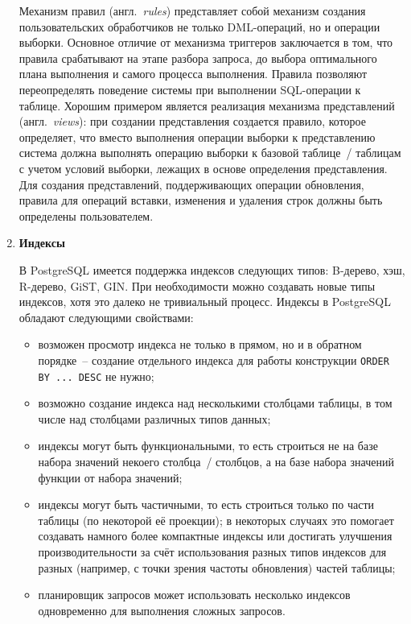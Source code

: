 \begin{enumerate}
    \tab Механизм правил (англ. \textit{rules}) представляет собой механизм создания пользовательских обработчиков не только DML-операций, но и операции выборки. Основное отличие от механизма триггеров заключается в том, что правила срабатывают на этапе разбора запроса, до выбора оптимального плана выполнения и самого процесса выполнения. Правила позволяют переопределять поведение системы при выполнении SQL-операции к таблице. Хорошим примером является реализация механизма представлений (англ. \textit{views}): при создании представления создается правило, которое определяет, что вместо выполнения операции выборки к представлению система должна выполнять операцию выборки к базовой таблице / таблицам с учетом условий выборки, лежащих в основе определения представления. Для создания представлений, поддерживающих операции обновления, правила для операций вставки, изменения и удаления строк должны быть определены пользователем.


    \item \textbf{Индексы}

    \tab В PostgreSQL имеется поддержка индексов следующих типов: B-дерево, хэш, R-дерево, GiST, GIN. При необходимости можно создавать новые типы индексов, хотя это далеко не тривиальный процесс. Индексы в PostgreSQL обладают следующими свойствами:
    \begin{itemize}
        \item возможен просмотр индекса не только в прямом, но и в обратном порядке – создание отдельного индекса для работы конструкции \texttt{ORDER BY ... DESC} не нужно;
        \item возможно создание индекса над несколькими столбцами таблицы, в том числе над столбцами различных типов данных;
        \item индексы могут быть функциональными, то есть строиться не на базе набора значений некоего столбца / столбцов, а на базе набора значений функции от набора значений;
        \item индексы могут быть частичными, то есть строиться только по части таблицы (по некоторой её проекции); в некоторых случаях это помогает создавать намного более компактные индексы или достигать улучшения производительности за счёт использования разных типов индексов для разных (например, с точки зрения частоты обновления) частей таблицы;
        \item планировщик запросов может использовать несколько индексов одновременно для выполнения сложных запросов.
    \end{itemize}



\end{enumerate}
